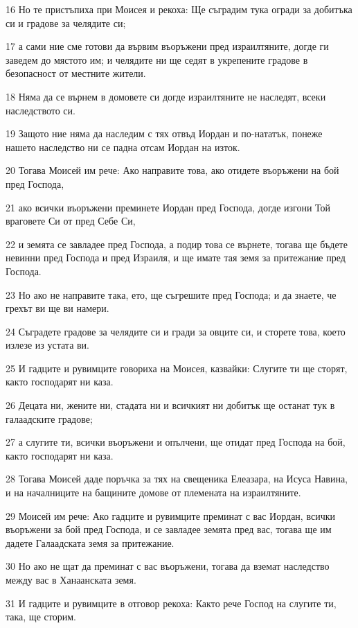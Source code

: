 \par 16 Но те пристъпиха при Моисея и рекоха: Ще съградим тука огради за добитъка си и градове за челядите си;
\par 17 а сами ние сме готови да вървим въоръжени пред израилтяните, догде ги заведем до мястото им; и челядите ни ще седят в укрепените градове в безопасност от местните жители.
\par 18 Няма да се върнем в домовете си догде израилтяните не наследят, всеки наследството си.
\par 19 Защото ние няма да наследим с тях отвъд Иордан и по-нататък, понеже нашето наследство ни се падна отсам Иордан на изток.
\par 20 Тогава Моисей им рече: Ако направите това, ако отидете въоръжени на бой пред Господа,
\par 21 ако всички въоръжени преминете Иордан пред Господа, догде изгони Той враговете Си от пред Себе Си,
\par 22 и земята се завладее пред Господа, а подир това се върнете, тогава ще бъдете невинни пред Господа и пред Израиля, и ще имате тая земя за притежание пред Господа.
\par 23 Но ако не направите така, ето, ще съгрешите пред Господа; и да знаете, че грехът ви ще ви намери.
\par 24 Съградете градове за челядите си и гради за овците си, и сторете това, което излезе из устата ви.
\par 25 И гадците и рувимците говориха на Моисея, казвайки: Слугите ти ще сторят, както господарят ни каза.
\par 26 Децата ни, жените ни, стадата ни и всичкият ни добитък ще останат тук в галаадските градове;
\par 27 а слугите ти, всички въоръжени и опълчени, ще отидат пред Господа на бой, както господарят ни каза.
\par 28 Тогава Моисей даде поръчка за тях на свещеника Елеазара, на Исуса Навина, и на началниците на бащините домове от племената на израилтяните.
\par 29 Моисей им рече: Ако гадците и рувимците преминат с вас Иордан, всички въоръжени за бой пред Господа, и се завладее земята пред вас, тогава ще им дадете Галаадската земя за притежание.
\par 30 Но ако не щат да преминат с вас въоръжени, тогава да вземат наследство между вас в Ханаанската земя.
\par 31 И гадците и рувимците в отговор рекоха: Както рече Господ на слугите ти, така, ще сторим.
